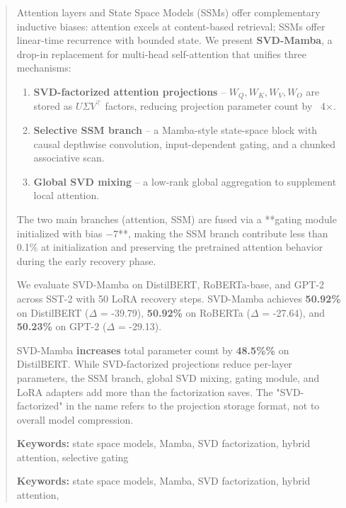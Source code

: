 \documentclass{article}
\begin{document}
\maketitle

\begin{abstract}
Attention layers and State Space Models (SSMs) offer complementary inductive 
biases: attention excels at content-based retrieval; SSMs offer linear-time 
recurrence with bounded state. We present \textbf{SVD-Mamba}, a drop-in replacement 
for multi-head self-attention that unifies three mechanisms:

\begin{enumerate}
\item \textbf{SVD-factorized attention projections} -- $W_Q, W_K, W_V, W_O$ are
  stored as $U \Sigma V^\top$ factors, reducing projection parameter count
  by ~4$\times$.
\item \textbf{Selective SSM branch} -- a Mamba-style state-space block with causal
  depthwise convolution, input-dependent gating, and a chunked associative
  scan.
\item \textbf{Global SVD mixing} -- a low-rank global aggregation to supplement
  local attention.

\end{enumerate}
The two main branches (attention, SSM) are fused via a **gating module 
initialized with bias $-7$**, making the SSM branch contribute less than 
0.1\% at initialization and preserving the pretrained attention behavior 
during the early recovery phase.

We evaluate SVD-Mamba on DistilBERT, RoBERTa-base, and GPT-2 across SST-2 
with 50 LoRA recovery steps. SVD-Mamba achieves 
\textbf{50.92\%} on DistilBERT ($\Delta$ = -39.79), \textbf{50.92\%} on RoBERTa 
($\Delta$ = -27.64), and \textbf{50.23\%} on GPT-2 ($\Delta$ = -29.13).

SVD-Mamba \textbf{increases} total parameter count by \textbf{48.5\%\%} 
on DistilBERT. While SVD-factorized projections reduce per-layer parameters, 
the SSM branch, global SVD mixing, gating module, and LoRA adapters add 
more than the factorization saves. The "SVD-factorized" in the name refers 
to the projection storage format, not to overall model compression.

\textbf{Keywords:} state space models, Mamba, SVD factorization, hybrid attention, 
selective gating



\vspace{0.5em}
\noindent\textbf{Keywords:} state space models, Mamba, SVD factorization, hybrid attention,
\end{abstract}
\end{document}
